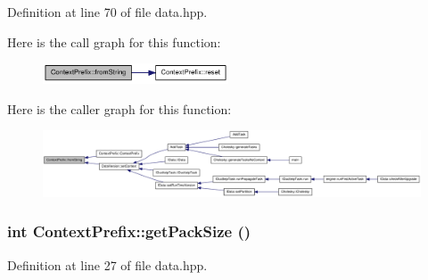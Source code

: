 Definition at line 70 of file data.hpp.

Here is the call graph for this function:\nopagebreak
\begin{figure}[H]
\begin{center}
\leavevmode
\includegraphics[width=156pt]{struct_context_prefix_a793d4b68722e1edd3e1a6272535be5fe_cgraph}
\end{center}
\end{figure}


Here is the caller graph for this function:\nopagebreak
\begin{figure}[H]
\begin{center}
\leavevmode
\includegraphics[width=420pt]{struct_context_prefix_a793d4b68722e1edd3e1a6272535be5fe_icgraph}
\end{center}
\end{figure}
\hypertarget{struct_context_prefix_a6d30f468ca52d1dce17ee24804892d52}{
\subsubsection[{getPackSize}]{\setlength{\rightskip}{0pt plus 5cm}int ContextPrefix::getPackSize ()}}
\label{struct_context_prefix_a6d30f468ca52d1dce17ee24804892d52}


Definition at line 27 of file data.hpp.

